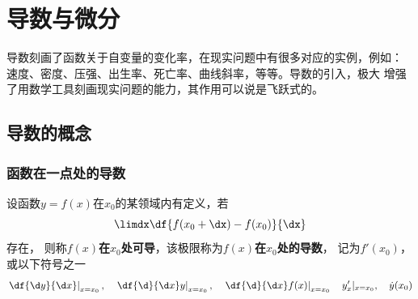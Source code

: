 
\setcounter{chapter}{1}

\chapter{导数与微分}

导数刻画了函数关于自变量的变化率，在现实问题中有很多对应的实例，例如：
速度、密度、压强、出生率、死亡率、曲线斜率，等等。导数的引入，极大
增强了用数学工具刻画现实问题的能力，其作用可以说是飞跃式的。

\section{导数的概念}

\subsection{函数在一点处的导数}

\begin{thx}
	设函数$y=f(x)$在$x_0$的某领域内有定义，若
	$$\limdx\df{f(x_0+\dx)-f(x_0)}{\dx}$$
	存在， 则称{\bf $f(x)$在$x_0$处可导}，该极限称为{\bf $f(x)$在$x_0$处的导数}， 记为$f'(x_0)$，或以下符号之一
	$$\left.\df{\d y}{\d x}\right|_{x=x_0},\quad\left.\df{\d
	}{\d x}y\right|_{x=x_0},\quad \left.\df{\d }{\d x}f(x)\right|_{x=x_0}\quad
	y'_x|_{x=x_0},\quad \dot{y}(x_0)$$
\end{thx}

